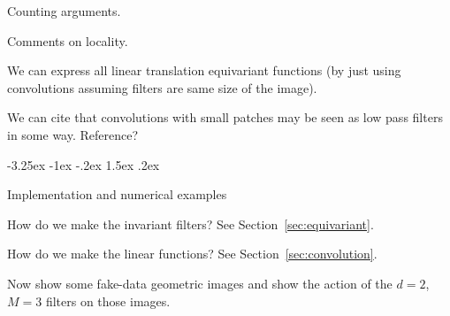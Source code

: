 \documentclass{article}
\makeatletter
\theoremstyle{plain}
\newcommand{\sectionname}{Section}
\newcommand{\secref}[1]{\sectionname~\ref{#1}}
\renewcommand\section{\@startsection {section}{1}{\z@}%
  {-3.25ex \@plus -1ex \@minus -.2ex}%
  {1.5ex \@plus .2ex}%
  {\raggedright\normalfont\large\bfseries}}%
\makeatother
\begin{document}
Counting arguments.

Comments on locality.

We can express all linear translation equivariant functions (by just using convolutions assuming filters are same size of the image). 

We can cite that convolutions with small patches may be seen as low pass filters in some way. Reference?

\section{Implementation and numerical examples}\label{sec:examples}

How do we make the invariant filters? See \secref{sec:equivariant}.

How do we make the linear functions? See \secref{sec:convolution}.

Now show some fake-data geometric images and show the action of the $d=2$, $M=3$ filters on those images.
\end{document}
